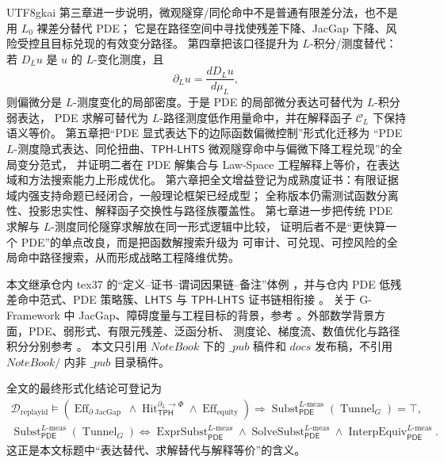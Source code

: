 \documentclass[12pt]{article}
\newcommand{\GFramework}{\textsf{G-Framework}}
\newcommand{\TPH}{\ensuremath{\mathsf{TPH}}}
\newcommand{\LHTS}{\ensuremath{\mathsf{LHTS}}}
\newcommand{\TPHLHTS}{\ensuremath{\mathsf{TPH\mbox{-}LHTS}}}
\newcommand{\PDE}{\ensuremath{\mathsf{PDE}}}
\DeclareMathOperator{\Eff}{Eff}
\DeclareMathOperator{\Hit}{Hit}
\DeclareMathOperator{\JacGap}{JacGap}
\DeclareMathOperator{\Tunnel}{Tunnel}
\DeclareMathOperator{\Subst}{Subst}
\DeclareMathOperator{\ExprSubst}{ExprSubst}
\DeclareMathOperator{\SolveSubst}{SolveSubst}
\DeclareMathOperator{\InterpEquiv}{InterpEquiv}
\newcommand{\Lmeas}{L\text{-}\mathrm{meas}}
\begin{document}
\begin{CJK*}{UTF8}{gkai}
第三章进一步说明，微观隧穿/同伦命中不是普通有限差分法，也不是用 \(L_0\) 裸差分替代 PDE；
它是在路径空间中寻找使残差下降、JacGap 下降、风险受控且目标兑现的有效变分路径。
第四章把该口径提升为 \(L\)-积分/测度替代：若 \(D_Lu\) 是 \(u\) 的 \(L\)-变化测度，且
\[
  \partial_Lu=\frac{dD_Lu}{d\mu_L},
\]
则偏微分是 \(L\)-测度变化的局部密度。于是 PDE 的局部微分表达可替代为 \(L\)-积分弱表达，
PDE 求解可替代为 \(L\)-路径测度低作用量命中，并在解释函子 \(\mathcal C_L\) 下保持语义等价。
第五章把“PDE 显式表达下的边际函数偏微控制”形式化迁移为
“PDE \(L\)-测度隐式表达、同伦扭曲、\TPHLHTS{} 微观隧穿命中与偏微下降工程兑现”的全局变分范式，
并证明二者在 PDE 解集合与 Law-Space 工程解释上等价，在表达域和方法搜索能力上形成优化。
第六章把全文增益登记为成熟度证书：有限证据域内强支持命题已经闭合，一般理论框架已经成型；
全称版本仍需测试函数分离性、投影忠实性、解释函子交换性与路径族覆盖性。
第七章进一步把传统 PDE 求解与 \(L\)-测度同伦隧穿求解放在同一形式逻辑中比较，
证明后者不是“更快算一个 PDE”的单点改良，而是把函数解搜索升级为
可审计、可兑现、可控风险的全局命中路径搜索，从而形成战略工程降维优势。

本文继承仓内 tex37 的“定义--证书--谓词因果链--备注”体例
\cite{RepoTex37SemanticGauge}，并与仓内 PDE 低残差命中范式、PDE 策略簇、\LHTS{} 与 \TPHLHTS{} 证书链相衔接
\cite{RepoTex55PDEParadigm,RepoTex53StrategyCluster,RepoTex56LHTS,RepoTex57TPHLHTS}。
关于 \GFramework{} 中 JacGap、障碍度量与工程目标的背景，参考
\cite{RepoAppMathVol1,RepoEconomicsVol}。外部数学背景方面，PDE、弱形式、有限元残差、泛函分析、
测度论、梯度流、数值优化与路径积分分别参考
\cite{Evans2010PDE,BrennerScott2008FEM,Brezis2011FunctionalAnalysis,Bogachev2007MeasureTheory,
AmbrosioGigliSavare2008GradientFlows,NocedalWright2006NumericalOptimization,FeynmanHibbs1965PathIntegrals,
FreidlinWentzell2012RandomPerturbations}。
本文只引用 \(NoteBook\) 下的 \(\_pub\) 稿件和 \(docs\) 发布稿，不引用 \(NoteBook/\) 内非 \(\_pub\) 目录稿件。

全文的最终形式化结论可登记为
\[
  \boxed{
  \begin{gathered}
  \mathcal D_{\mathrm{replayid}}
  \models
  \left(
  \Eff_{\partial\JacGap}
  \wedge
  \Hit_{\TPH}^{\partial_L\to\Phi}
  \wedge
  \Eff_{\mathrm{equity}}
  \right)
  \Rightarrow
  \Subst_{\PDE}^{\Lmeas}(\Tunnel_G)=\top,\\
  \Subst_{\PDE}^{\Lmeas}(\Tunnel_G)
  \Longleftrightarrow
  \ExprSubst_{\PDE}^{\Lmeas}
  \wedge
  \SolveSubst_{\PDE}^{\Lmeas}
  \wedge
  \InterpEquiv_{\PDE}^{\Lmeas}.
  \end{gathered}
  }
\]
这正是本文标题中“表达替代、求解替代与解释等价”的含义。


\end{CJK*}
\end{document}
